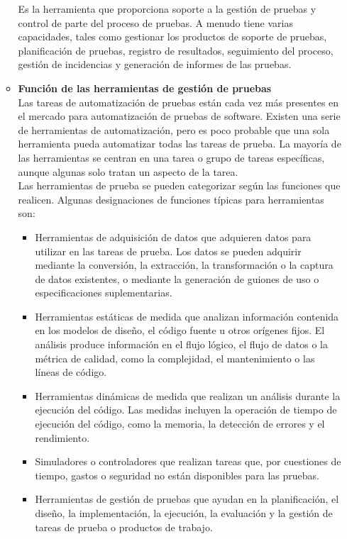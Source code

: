 \documentclass[12pt,a4paper,oneside]{book}
\begin{document}
\begin{enumerate}
\begin{itemize}
					Es la herramienta que proporciona soporte a la gestión de pruebas y control de parte del proceso de pruebas. A menudo tiene varias capacidades, tales como gestionar los productos de soporte de pruebas, planificación de pruebas, registro de resultados, seguimiento del proceso, gestión de incidencias y generación de informes de las pruebas.\\
					
				\item \textbf{Función de las herramientas de gestión de pruebas}\\
				
					Las tareas de automatización de pruebas están cada vez más presentes en el mercado para automatización de pruebas de software. Existen una serie de herramientas de automatización, pero es poco probable que una sola herramienta pueda automatizar todas las tareas de prueba. La mayoría de las herramientas se centran en una tarea o grupo de tareas específicas, aunque algunas solo tratan un aspecto de la tarea.\\ 
					
					Las herramientas de prueba se pueden categorizar según las funciones que realicen. Algunas designaciones de funciones típicas para herramientas son:\\
					
						\begin{itemize}
							\item Herramientas de adquisición de datos que adquieren datos para utilizar en las tareas de prueba. Los datos se pueden adquirir mediante la conversión, la extracción, la transformación o la captura de datos existentes, o mediante la generación de guiones de uso o especificaciones suplementarias. \\
							\item Herramientas estáticas de medida que analizan información contenida en los modelos de diseño, el código fuente u otros orígenes fijos. El análisis produce información en el flujo lógico, el flujo de datos o la métrica de calidad, como la complejidad, el mantenimiento o las líneas de código.\\
							\item Herramientas dinámicas de medida que realizan un análisis durante la ejecución del código. Las medidas incluyen la operación de tiempo de ejecución del código, como la memoria, la detección de errores y el rendimiento. \\
							\item Simuladores o controladores que realizan tareas que, por cuestiones de tiempo, gastos o seguridad no están disponibles para las pruebas. \\
							\item Herramientas de gestión de pruebas que ayudan en la planificación, el diseño, la implementación, la ejecución, la evaluación y la gestión de tareas de prueba o productos de trabajo.\\
							

\end{itemize}
\end{itemize}
\end{enumerate}
\end{document}

